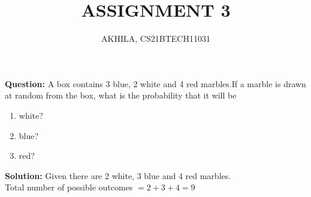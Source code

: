 \documentclass[journal,12pt,twocolumn]{IEEEtran}
\newcommand{\question}{\noindent \textbf{Question: }}
\newcommand{\solution}{\noindent \textbf{Solution: }}
\begin{document}
\title{ASSIGNMENT 3}
\author{AKHILA, CS21BTECH11031}

\maketitle
\question
A box contains 3 blue, 2 white and 4 red marbles.If a marble is drawn at random from the box, what is the probability that it will be
    \begin{enumerate}[label=(\roman{enumi})]
		\item white?
		\item blue?
		\item red?
    \end{enumerate}
\solution
Given there are 2 white, 3 blue and 4 red marbles.\\
Total number of possible outcomes $=2+3+4=9$\\
\end{document}
